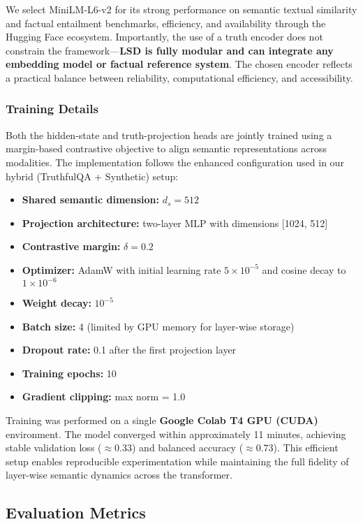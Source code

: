 \documentclass[11pt]{article}
\begin{document}
We select MiniLM-L6-v2 for its strong performance on semantic textual similarity and factual entailment benchmarks, efficiency, and availability through the Hugging Face ecosystem. Importantly, the use of a truth encoder does not constrain the framework—\textbf{LSD is fully modular and can integrate any embedding model or factual reference system}. The chosen encoder reflects a practical balance between reliability, computational efficiency, and accessibility.

\subsubsection{Training Details}
Both the hidden-state and truth-projection heads are jointly trained using a margin-based contrastive objective to align semantic representations across modalities. The implementation follows the enhanced configuration used in our hybrid (TruthfulQA + Synthetic) setup:

\begin{itemize}[leftmargin=*]
    \item \textbf{Shared semantic dimension:} $d_s = 512$
    \item \textbf{Projection architecture:} two-layer MLP with dimensions [1024, 512]
    \item \textbf{Contrastive margin:} $\delta = 0.2$
    \item \textbf{Optimizer:} AdamW with initial learning rate $5 \times 10^{-5}$ and cosine decay to $1 \times 10^{-6}$
    \item \textbf{Weight decay:} $10^{-5}$
    \item \textbf{Batch size:} 4 (limited by GPU memory for layer-wise storage)
    \item \textbf{Dropout rate:} 0.1 after the first projection layer
    \item \textbf{Training epochs:} 10
    \item \textbf{Gradient clipping:} max norm = 1.0
\end{itemize}

Training was performed on a single \textbf{Google Colab T4 GPU (CUDA)} environment. The model converged within approximately 11 minutes, achieving stable validation loss ($\approx 0.33$) and balanced accuracy ($\approx 0.73$). This efficient setup enables reproducible experimentation while maintaining the full fidelity of layer-wise semantic dynamics across the transformer.


\subsection{Evaluation Metrics}
\end{document}
